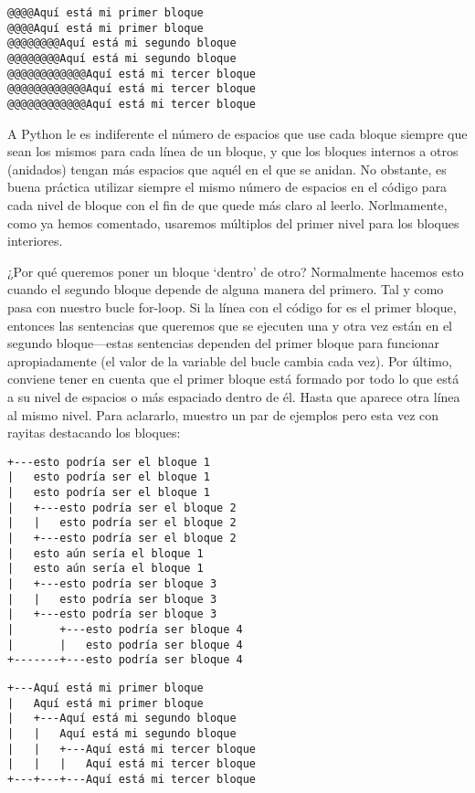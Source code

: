 \begin{listing}
\begin{verbatim}
@@@@Aquí está mi primer bloque
@@@@Aquí está mi primer bloque
@@@@@@@@Aquí está mi segundo bloque
@@@@@@@@Aquí está mi segundo bloque
@@@@@@@@@@@@Aquí está mi tercer bloque
@@@@@@@@@@@@Aquí está mi tercer bloque
@@@@@@@@@@@@Aquí está mi tercer bloque
\end{verbatim}
\end{listing}

A Python le es indiferente el número de espacios que use cada bloque siempre que sean los mismos para cada línea de un bloque, y que los bloques internos a otros (anidados) tengan más espacios que aquél en el que se anidan. No obstante, es buena práctica utilizar siempre el mismo número de espacios en el código para cada nivel de bloque con el fin de que quede más claro al leerlo. Norlmamente, como ya hemos comentado, usaremos múltiplos del primer nivel para los bloques interiores.

¿Por qué queremos poner un bloque `dentro' de otro?  Normalmente hacemos esto cuando el segundo bloque depende de alguna manera del primero.  Tal y como pasa con nuestro bucle for-loop.  Si la línea con el código for es el primer bloque, entonces las sentencias que queremos que se ejecuten una y otra vez están en el segundo bloque---estas sentencias dependen del primer bloque para funcionar apropiadamente (el valor de la variable del bucle cambia cada vez).
Por último, conviene tener en cuenta que el primer bloque está formado por todo lo que está a su nivel de espacios o más espaciado dentro de él. Hasta que aparece otra línea al mismo nivel.
Para aclararlo, muestro un par de ejemplos pero esta vez con rayitas destacando los bloques:

\begin{listing}
\begin{verbatim}
+---esto podría ser el bloque 1
|   esto podría ser el bloque 1
|   esto podría ser el bloque 1
|   +---esto podría ser el bloque 2
|   |   esto podría ser el bloque 2
|   +---esto podría ser el bloque 2
|   esto aún sería el bloque 1
|   esto aún sería el bloque 1
|   +---esto podría ser bloque 3
|   |   esto podría ser bloque 3
|   +---esto podría ser bloque 3
|       +---esto podría ser bloque 4
|       |   esto podría ser bloque 4
+-------+---esto podría ser bloque 4
\end{verbatim}
\end{listing}


\begin{listing}
\begin{verbatim}
+---Aquí está mi primer bloque
|   Aquí está mi primer bloque
|   +---Aquí está mi segundo bloque
|   |   Aquí está mi segundo bloque
|   |   +---Aquí está mi tercer bloque
|   |   |   Aquí está mi tercer bloque
+---+---+---Aquí está mi tercer bloque
\end{verbatim}
\end{listing}

